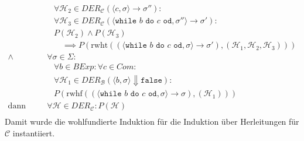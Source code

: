 \begin{align*}
						                  & \quad \forall \mathcal{H} _ 2 \in \textit{DER} _ \mathcal{C} (\langle c, \sigma \rangle \rightarrow \sigma'') : \tag{Herleitungen in Prämisse}                                                                                                            \\
						                  & \quad \forall \mathcal{H} _ 3 \in \textit{DER} _ \mathcal{C} (\langle \texttt{while } b \texttt{ do } c \texttt{ od}, \sigma'' \rangle \rightarrow \sigma') : \tag{Herleitungen in Prämisse}                                                              \\
						                  & \quad P(\mathcal{H} _ 2) \land P(\mathcal{H} _ 3) \tag{Prämisse}                                                                                                                                                                                          \\
						                  & \quad\quad \implies P(\text{rwht}((\langle \texttt{while } b \texttt{ do } c \texttt{ od}, \sigma \rangle \rightarrow \sigma'), (\mathcal{H} _ 1, \mathcal{H} _ 2, \mathcal{H} _ 3))) \tag{Konklusion}                                                    \\
						\land             & \,\forall \sigma \in \Sigma : \tag{Zustände}                                                                                                                                                                                                              \\
						                  & \quad \forall b \in \textit{BExp} : \forall c \in \textit{Com} : \tag{Ausdrucksbestandteile}                                                                                                                                                              \\
						                  & \quad \forall \mathcal{H} _ 1 \in \textit{DER} _ \mathcal{B} (\langle b, \sigma \rangle \Downarrow \texttt{false}) : \tag{Kalkülfremde Herleitungen}                                                                                                      \\
						                  & \quad P(\text{rwhf}((\langle \texttt{while } b \texttt{ do } c \texttt{ od}, \sigma \rangle \rightarrow \sigma), (\mathcal{H} _ 1))) \tag{Konklusion}                                                                                                     \\
						\text{dann gilt:} & \,\forall \mathcal{H} \in \textit{DER} _ \mathcal{C} : P(\mathcal{H})                                                                                                                                                                                     \\
					\end{align*}
					Damit wurde die wohlfundierte Induktion für die Induktion über Herleitungen für $ \mathcal{C} $ instantiiert.

